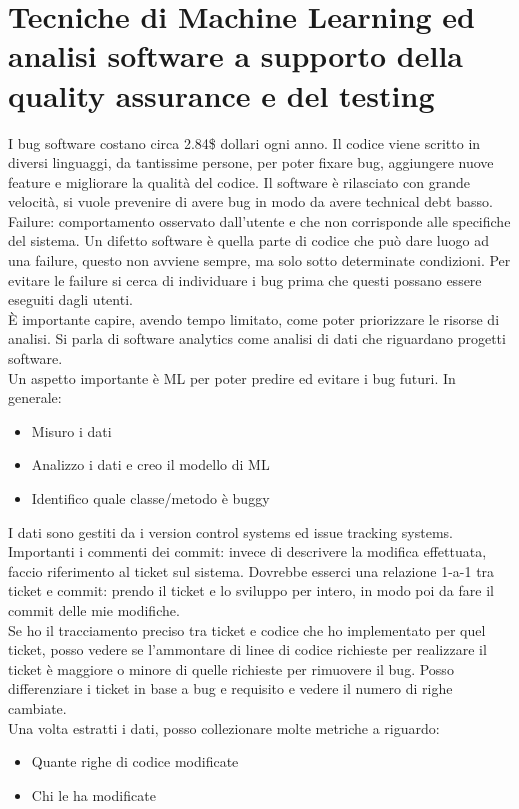 \documentclass{article}
\begin{document}
\section{Tecniche di Machine Learning ed analisi software a supporto della quality assurance e del testing}
I bug software costano circa 2.84\$ dollari ogni anno. Il codice viene scritto in diversi linguaggi, da tantissime persone, per poter fixare bug, aggiungere nuove feature e migliorare la qualità del codice. Il software è rilasciato con grande velocità, si vuole prevenire di avere bug in modo da avere technical debt basso.\\ Failure: comportamento osservato dall'utente e che non corrisponde alle specifiche del sistema. Un difetto software è quella parte di codice che può dare luogo ad una failure, questo non avviene sempre, ma solo sotto determinate condizioni. Per evitare le failure si cerca di individuare i bug prima che questi possano essere eseguiti dagli utenti.\\ È importante capire, avendo tempo limitato, come poter priorizzare le risorse di analisi. Si parla di software analytics come analisi di dati che riguardano progetti software.\\ Un aspetto importante è ML per poter predire ed evitare i bug futuri. In generale:
\begin{itemize}
\item Misuro i dati
\item Analizzo i dati e creo il modello di ML
\item Identifico quale classe/metodo è buggy
\end{itemize}
I dati sono gestiti da i version control systems ed issue tracking systems.\\ Importanti i commenti dei commit: invece di descrivere la modifica effettuata, faccio riferimento al ticket sul sistema. Dovrebbe esserci una relazione 1-a-1 tra ticket e commit: prendo il ticket e lo sviluppo per intero, in modo poi da fare il commit delle mie modifiche.\\ Se ho il tracciamento preciso tra ticket e codice che ho implementato per quel ticket, posso vedere se l'ammontare di linee di codice richieste per realizzare il ticket è maggiore o minore di quelle richieste per rimuovere il bug. Posso differenziare i ticket in base a bug e requisito e vedere il numero di righe cambiate.\\ Una volta estratti i dati, posso collezionare molte metriche a riguardo:
\begin{itemize}
\item Quante righe di codice modificate
\item Chi le ha modificate
\end{itemize}
\end{document}
